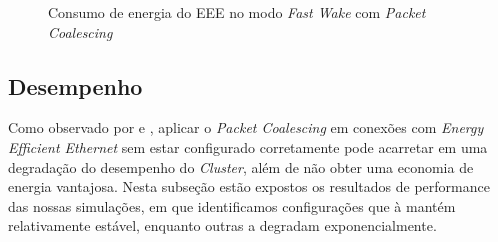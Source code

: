 \begin{figure}[!htb]
    \centering
    \label{fig:EEEFastWakePaCo}
    
    \hfill
    
    \caption{\centering Consumo de energia do EEE no modo \emph{Fast Wake} com \emph{Packet Coalescing}}
\end{figure}

\subsection{Desempenho}

Como observado por \cite{mostowfi2011saving} e \cite{silva2018eon}, aplicar o \emph{Packet Coalescing} em conexões com \emph{Energy Efficient Ethernet} sem estar configurado corretamente pode acarretar em uma degradação do desempenho do \emph{Cluster}, além de não obter uma economia de energia vantajosa. Nesta subseção estão expostos os resultados de performance das nossas simulações, em que identificamos configurações que à mantém relativamente estável, enquanto outras a degradam exponencialmente.

